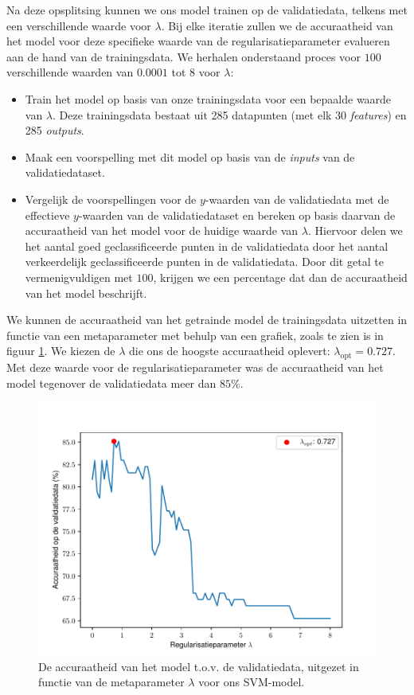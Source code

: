 \documentclass[twoside, kulak]{kulakreport}
\begin{document}
	Na deze opsplitsing kunnen we ons model trainen op de validatiedata, telkens met een verschillende waarde voor \(\lambda\). Bij elke iteratie zullen we de accuraatheid van het model voor deze specifieke waarde van de regularisatieparameter evalueren aan de hand van de trainingsdata. We herhalen onderstaand proces voor \(100\) verschillende waarden van \(0.0001\) tot \(8\) voor \(\lambda\):
	
	\begin{itemize}
		\item Train het model op basis van onze trainingsdata voor een bepaalde waarde van \(\lambda\). Deze trainingsdata bestaat uit 285 datapunten (met elk 30 \textit{features}) en 285 \textit{outputs}.
		\item Maak een voorspelling met dit model op basis van de \textit{inputs} van de validatiedataset.
		\item Vergelijk de voorspellingen voor de \(y\)-waarden van de validatiedata met de effectieve \(y\)-waarden van de validatiedataset en bereken op basis daarvan de accuraatheid van het model voor de huidige waarde van \(\lambda\). Hiervoor delen we het aantal goed geclassificeerde punten in de validatiedata door het aantal verkeerdelijk geclassificeerde punten in de validatiedata. Door dit getal te vermenigvuldigen met \(100\), krijgen we een percentage dat dan de accuraatheid van het model beschrijft.
	\end{itemize}
	
	We kunnen de accuraatheid van het getrainde model de trainingsdata uitzetten in functie van een metaparameter met behulp van een grafiek, zoals te zien is in figuur \ref{fig:metaparameter}. We kiezen de \(\lambda\) die ons de hoogste accuraatheid oplevert: \(\lambda_{\text{opt}}=0.727\). Met deze waarde voor de regularisatieparameter was de accuraatheid van het model tegenover de validatiedata meer dan \(85\%\).
	
	\begin{figure}
		\centering
		\includegraphics{accuraatheid}
		\caption{De accuraatheid van het model t.o.v. de validatiedata, uitgezet in functie van de metaparameter \(\lambda\) voor ons SVM-model.}
		\label{fig:metaparameter}
	\end{figure}
	
\end{document}

